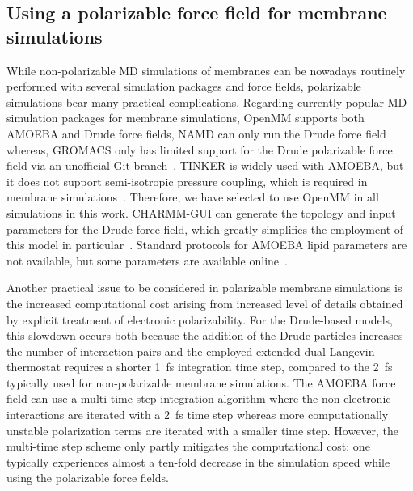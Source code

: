 \documentclass[journal=jacsat,manuscript=article,layout=singlecolumn]{achemso}
\begin{document}
\subsection{Using a polarizable force field for membrane simulations}



While non-polarizable MD simulations of membranes can be nowadays routinely performed with several simulation packages and force fields, polarizable simulations bear many practical complications.
Regarding currently popular MD simulation packages for membrane simulations, OpenMM supports both AMOEBA and Drude force fields, NAMD can only run the Drude force field whereas, GROMACS
only has limited support for the Drude polarizable force field via an unofficial Git-branch~\cite{drudegithub}. %
TINKER is widely used with AMOEBA, but it does not support semi-isotropic pressure coupling, which %
is required in membrane simulations~\cite{xxx}.
%
Therefore, we have selected to use OpenMM in all simulations in this work.
CHARMM-GUI can generate the topology and input parameters for the Drude force field, which greatly simplifies the employment of this model in particular~\cite{kognole2022charmm}. Standard protocols for AMOEBA lipid parameters are not available, but some parameters are available online~\cite{amoebagithub,klesse2020induced}.

Another practical issue to be considered in polarizable membrane simulations is the increased computational cost arising from increased level of details obtained by explicit treatment of electronic polarizability. For the Drude-based models, this slowdown occurs both because the addition of the Drude particles increases the number of interaction pairs and the employed extended dual-Langevin thermostat requires a shorter 1~fs integration time step, compared to the 2~fs typically used for non-polarizable membrane simulations. The AMOEBA force field can use a multi time-step integration algorithm where the non-electronic interactions are iterated with a 2~fs time step whereas more computationally unstable polarization terms are iterated with a smaller time step. However, the multi-time step scheme  only partly mitigates the computational cost: one typically experiences almost a ten-fold decrease in the simulation speed while using the polarizable force fields. 
\end{document}

